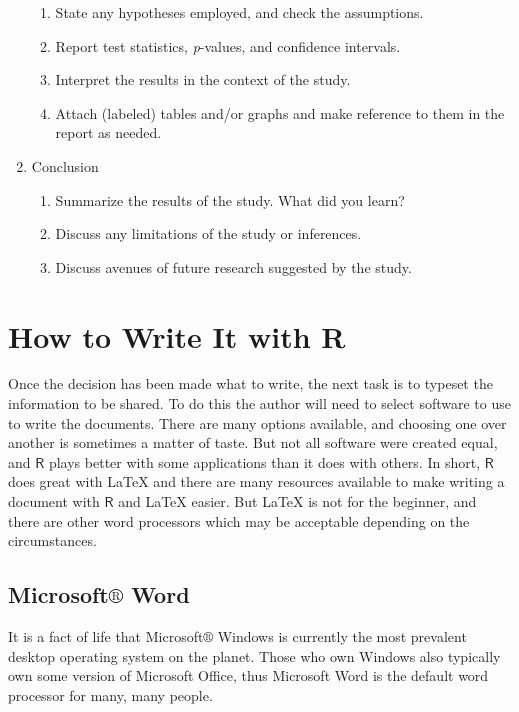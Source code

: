 \documentclass[captions=tableheading]{scrbook}
\begin{document}
\begin{example}
\begin{enumerate}
\begin{enumerate}
\item State any hypotheses employed, and check the assumptions.
\item Report test statistics, \emph{p}-values, and confidence intervals.
\item Interpret the results in the context of the study.
\item Attach (labeled) tables and/or graphs and make reference to them in the report as needed.
\end{enumerate}
\item Conclusion
\begin{enumerate}
\item Summarize the results of the study. What did you learn?
\item Discuss any limitations of the study or inferences.
\item Discuss avenues of future research suggested by the study.
\end{enumerate}
\end{enumerate}
\section{How to Write It with R}
\label{sec-22-2}
\label{sec-How-to-Write}


Once the decision has been made what to write, the next task is to typeset the information to be shared. To do this the author will need to select software to use to write the documents. There are many options available, and choosing one over another is sometimes a matter of taste. But not all software were created equal, and \(\mathsf{R}\) plays better with some applications than it does with others. 
In short, \(\mathsf{R}\) does great with \LaTeX{} and there are many resources available to make writing a document with \(\mathsf{R}\) and \LaTeX{} easier. But \LaTeX{} is not for the beginner, and there are other word processors which may be acceptable depending on the circumstances.
\subsection{Microsoft\(\circledR\) Word}
\label{sec-22-2-1}

It is a fact of life that Microsoft\(\circledR\) Windows is currently the most prevalent desktop operating system on the planet. Those who own Windows also typically own some version of Microsoft Office, thus Microsoft Word is the default word processor for many, many people.  


\end{example}
\end{document}
